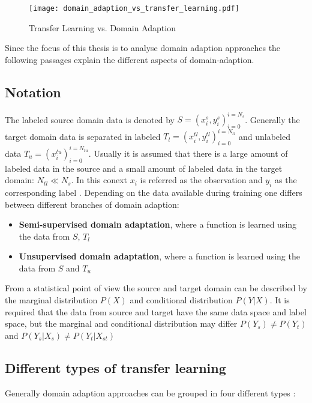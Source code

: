 \begin{figure}[htpb]
  \centering
  \texttt{[image: domain\_adaption\_vs\_transfer\_learning.pdf]}
  \caption {Transfer Learning vs. Domain Adaption} \label{fig:domain_adaption_vs_transfer_learning}
\end{figure}
\FloatBarrier 

Since the focus of this thesis is to analyse domain adaption approaches the following passages explain the different aspects of domain-adaption.
\subsection{Notation}
The labeled source domain data is denoted by  $S = {(x_{i}^{s}, y_{i}^{s})_{i = 0}^{i = N_{s}}}$. Generally the target domain data is separated in labeled $T_{l} = {(x_{i}^{tl}, y_{i}^{tl})_{i = 0}^{i = N_{tl}}}$ and unlabeled data $T_{u} = {(x_{i}^{tu})_{i = 0}^{i = N_{tu}}}$. Usually it is assumed that there is a large amount of labeled data in the source and a small amount of labeled data in the target domain: $N_{tl} \ll N_{s}$. In this conext $x_{i}$ is referred as the observation and $y_{i}$ as the corresponding label  \cite{Patel2015}. Depending on the data available during training one differs between different branches of domain adaption: 
\begin{itemize}
\item \textbf{Semi-supervised domain adaptation}, where a function is learned using the data from $S$, $T_{l}$
\item \textbf{Unsupervised domain adaptation}, where a function is learned using the data from $S$ and $T_{u}$ \cite{Patel2015} 
\end{itemize}

From a statistical point of view the source and target domain can be described by the marginal distribution $P(X)$ and conditional distribution $P(Y|X)$. It is required that the data from source and target have the same data space and label space, but the marginal and conditional distribution may differ $P(Y_{s}) \neq P(Y_{t})$ and $P(Y_{s}|X_{s}) \neq P(Y_{t}|X_{st})$ \cite{Qikang2020}

\subsection{Different types of transfer learning}
Generally domain adaption approaches can be grouped in four different types \cite{AZAMFAR2020103932}:  

